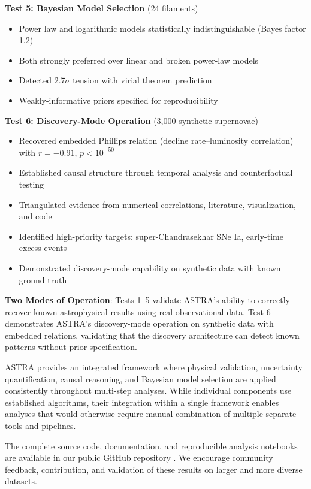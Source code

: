 \documentclass[usenatbib]{rasti}
\begin{document}
\textbf{Test 5: Bayesian Model Selection} (24 filaments)
\begin{itemize}
\item Power law and logarithmic models statistically indistinguishable (Bayes factor 1.2)
\item Both strongly preferred over linear and broken power-law models
\item Detected 2.7$\sigma$ tension with virial theorem prediction
\item Weakly-informative priors specified for reproducibility
\end{itemize}

\textbf{Test 6: Discovery-Mode Operation} (3,000 synthetic supernovae)
\begin{itemize}
\item Recovered embedded Phillips relation (decline rate--luminosity correlation) with $r = -0.91$, $p < 10^{-50}$
\item Established causal structure through temporal analysis and counterfactual testing
\item Triangulated evidence from numerical correlations, literature, visualization, and code
\item Identified high-priority targets: super-Chandrasekhar SNe Ia, early-time excess events
\item Demonstrated discovery-mode capability on synthetic data with known ground truth
\end{itemize}

\textbf{Two Modes of Operation}: Tests 1--5 validate ASTRA's ability to correctly recover known astrophysical results using real observational data. Test 6 demonstrates ASTRA's discovery-mode operation on synthetic data with embedded relations, validating that the discovery architecture can detect known patterns without prior specification.

ASTRA provides an integrated framework where physical validation, uncertainty quantification, causal reasoning, and Bayesian model selection are applied consistently throughout multi-step analyses. While individual components use established algorithms, their integration within a single framework enables analyses that would otherwise require manual combination of multiple separate tools and pipelines.

The complete source code, documentation, and reproducible analysis notebooks are available in our public GitHub repository \cite{astra_github}. We encourage community feedback, contribution, and validation of these results on larger and more diverse datasets.
\end{document}
